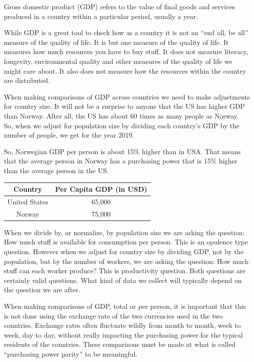 \documentclass[
]{book}
\begin{document}
Gross domestic product (GDP) refers to the value of final goods and services produced in a country within a particular period, usually a year.

While GDP is a great tool to check how as a country it is not an ``end all, be all'' measure of the quality of life. It is but one measure of the quality of life. It measures how much resources you have to buy stuff. It does not measure literacy, longevity, environmental quality and other measures of the quality of life we might care about. It also does not measure how the resources within the country are distributed.

When making comparisons of GDP across countries we need to make adjustments for country size. It will not be a surprise to anyone that the US has higher GDP than Norway. After all, the US has about 60 times as many people as Norway. So, when we adjust for population size by dividing each country's GDP by the number of people, we get for the year 2019.

So, Norwegian GDP per person is about 15\% higher than in USA. That means that the average person in Norway has a purchasing power that is 15\% higher than the average person in the US.

\begin{longtable}[]{@{}cc@{}}
\toprule
Country & Per Capita GDP (in USD) \\
\midrule
\endhead
United States & 65,000 \\
Norway & 75,000 \\
\bottomrule
\end{longtable}

When we divide by, or normalize, by population size we are asking the question: How much stuff is available for consumption per person. This is an opulence type question. However when we adjust for country size by dividing GDP, not by the population, but by the number of workers, we are asking the question: How much stuff can each worker produce? This is productivity question. Both questions are certainly valid questions. What kind of data we collect will typically depend on the question we are after.

When making comparisons of GDP, total or per person, it is important that this is not done using the exchange rate of the two currencies used in the two countries. Exchange rates often fluctuate wildly from month to month, week to week, day to day, without really impacting the purchasing power for the typical residents of the countries. These comparisons must be made at what is called ``purchasing power parity'' to be meaningful.
\end{document}

